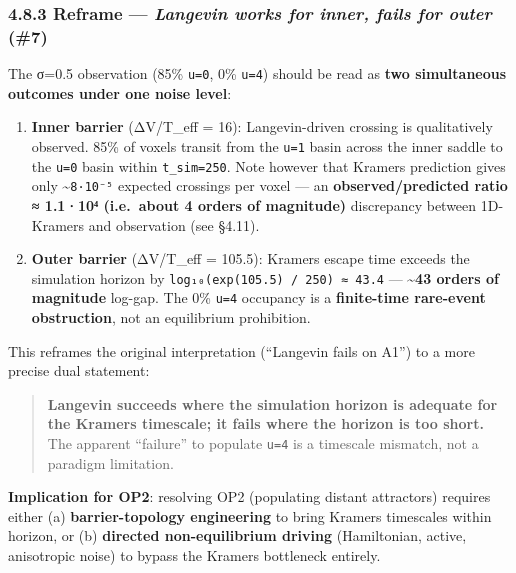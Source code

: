 \documentclass[
]{article}
\begin{document}
\hypertarget{reframe-langevin-works-for-inner-fails-for-outer-7}{%
\subsubsection{\texorpdfstring{4.8.3 Reframe --- \emph{Langevin works
for inner, fails for outer}
(\#7)}{4.8.3 Reframe --- Langevin works for inner, fails for outer (\#7)}}\label{reframe-langevin-works-for-inner-fails-for-outer-7}}

The σ=0.5 observation (85\% \texttt{u=0}, 0\% \texttt{u=4}) should be
read as \textbf{two simultaneous outcomes under one noise level}:

\begin{enumerate}
\def\labelenumi{\arabic{enumi}.}
\item
  \textbf{Inner barrier} (ΔV/T\_eff = 16): Langevin-driven crossing is
  qualitatively observed. 85\% of voxels transit from the \texttt{u=1}
  basin across the inner saddle to the \texttt{u=0} basin within
  \texttt{t\_sim=250}. Note however that Kramers prediction gives only
  \textasciitilde{}\texttt{8·10⁻⁵} expected crossings per voxel --- an
  \textbf{observed/predicted ratio ≈ 1.1·10⁴ (i.e.~about 4 orders of
  magnitude)} discrepancy between 1D-Kramers and observation (see
  §4.11).
\item
  \textbf{Outer barrier} (ΔV/T\_eff = 105.5): Kramers escape time
  exceeds the simulation horizon by
  \texttt{log₁₀(exp(105.5)\ /\ 250)\ ≈\ 43.4} ---
  \textbf{\textasciitilde43 orders of magnitude} log-gap. The 0\%
  \texttt{u=4} occupancy is a \textbf{finite-time rare-event
  obstruction}, not an equilibrium prohibition.
\end{enumerate}

This reframes the original interpretation (``Langevin fails on A1'') to
a more precise dual statement:

\begin{quote}
\textbf{Langevin succeeds where the simulation horizon is adequate for
the Kramers timescale; it fails where the horizon is too short.} The
apparent ``failure'' to populate \texttt{u=4} is a timescale mismatch,
not a paradigm limitation.
\end{quote}

\textbf{Implication for OP2}: resolving OP2 (populating distant
attractors) requires either (a) \textbf{barrier-topology engineering} to
bring Kramers timescales within horizon, or (b) \textbf{directed
non-equilibrium driving} (Hamiltonian, active, anisotropic noise) to
bypass the Kramers bottleneck entirely.
\end{document}
